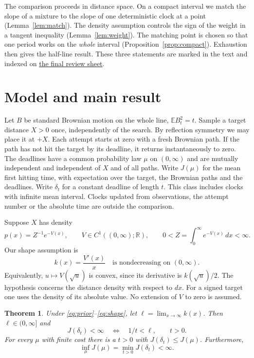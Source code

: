 \documentclass[11pt]{article}
\newtheorem{theorem}{Theorem}
\newcommand{\E}{\mathbb E}
\begin{document}
The comparison proceeds in distance space. On a compact interval we match
the slope of a mixture to the slope of one deterministic clock at a point
(Lemma~\ref{lem:match}). The density assumption controls the sign of the
weight in a tangent inequality (Lemma~\ref{lem:weight}). The matching
point is chosen so that one period works on the \emph{whole} interval
(Proposition~\ref{prop:compact}). Exhaustion then gives the half-line
result. These three statements are marked in the text and indexed on
\hyperlink{reviewguide}{the final review sheet}.

\section{Model and main result}
Let $B$ be standard Brownian motion on the whole line, $\E B_t^2=t$.
Sample a target distance $X>0$ once, independently of the search. By
reflection symmetry we may place it at $+X$. Each attempt starts at zero
with a fresh Brownian path. If the path has not hit the target by its
deadline, it returns instantaneously to zero. The deadlines have a common
probability law $\mu$ on $(0,\infty)$ and are mutually independent and
independent of $X$ and of all paths. Write $J(\mu)$ for the mean first hitting time, with expectation over the
target, the Brownian paths and the deadlines. Write $\delta_t$ for a
constant deadline of length $t$.
This class includes clocks with infinite mean interval. Clocks updated
from observations, the attempt number or the absolute time are outside
the comparison.

Suppose $X$ has density
\begin{equation}\label{eq:prior}
 p(x)=Z^{-1}e^{-V(x)},\qquad
 V\in C^1((0,\infty);\mathbb R),\qquad
 0<Z=\int_0^\infty e^{-V(x)}\,dx<\infty .
\end{equation}
Our shape assumption is
\begin{equation}\label{eq:shape}
 k(x)=\frac{V'(x)}{x}\quad\text{is nondecreasing on }(0,\infty).
\end{equation}
Equivalently, $u\mapsto V(\sqrt u)$ is convex, since its derivative is
$k(\sqrt u)/2$. The hypothesis concerns the distance density with respect
to $dx$. For a signed target one uses the density of its absolute value.
No extension of $V$ to zero is assumed.

\begin{theorem}\label{th:main}
Under \eqref{eq:prior}--\eqref{eq:shape}, let
$\ell=\lim_{x\to\infty} k(x)$. Then $\ell\in(0,\infty]$ and
\begin{equation}\label{eq:finite}
 J(\delta_t)<\infty \quad\Longleftrightarrow\quad 1/t<\ell,\qquad t>0 .
\end{equation}
For every $\mu$ with finite cost there is a $t>0$ with
$J(\delta_t)\le J(\mu)$. Furthermore,
\[
       \inf_{\mu}J(\mu)=\min_{t>0}J(\delta_t)<\infty .
\]
\end{theorem}
\end{document}
